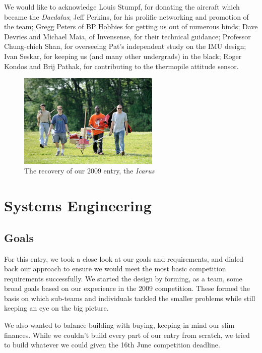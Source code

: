 \documentclass[10pt,twocolumns]{report}
\begin{document}
We would like to acknowledge
Louis Stumpf, for donating the aircraft which became the \emph{Daedalus};
Jeff Perkins, for his prolific networking and promotion of the team;
Gregg Peters of BP Hobbies for getting us out of numerous binds;
Dave Devries and Michael Maia, of Invensense, for their technical guidance;
Professor Chung-chieh Shan, for overseeing Pat's independent study on the IMU design;
Ivan Seskar, for keeping us (and many other undergrads) in the black;
Roger Kondos and Brij Pathak, for contributing to the thermopile attitude sensor.

\begin{figure}[b!]
	\centering
	\includegraphics[width=0.6\textwidth]{../images/wreckage.jpg}
	\caption{The recovery of our 2009 entry, the \emph{Icarus}}
	\label{fig:wreckage}
\end{figure}

\newpage
\section{Systems Engineering}
\subsection{Goals}
For this entry, we took a close look at our goals and requirements, and dialed back our approach to ensure we would meet the most basic competition requirements successfully.
We started the design by forming, as a team, some broad goals based on our experience in the 2009 competition.
These formed the basis on which sub-teams and individuals tackled the smaller problems while still keeping an eye on the big picture. 

We also wanted to balance building with buying, keeping in mind our slim finances. While we couldn't build every part of our entry from scratch, we tried to build whatever we could given the 16th June competition deadline.

\end{document}
